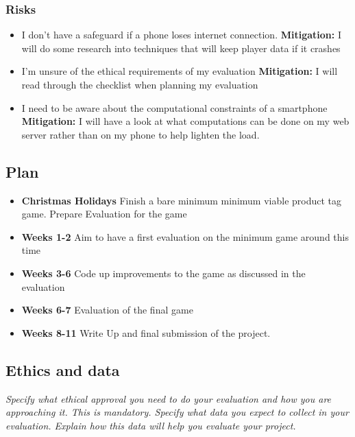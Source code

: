 \documentclass[11pt]{article}
\begin{document}
\subsubsection{Risks}\label{risks}


\begin{itemize}
    \tightlist
    \item I don't have a safeguard if a phone loses internet connection. \textbf{Mitigation:} I will do some research into techniques that will keep player data if it crashes
    \item I'm unsure of the ethical requirements of my evaluation \textbf{Mitigation:} I will read through the checklist when planning my evaluation
    \item I need to be aware about the computational constraints of a smartphone \textbf{Mitigation:} I will have a look at what computations can be done on my web server rather than on my phone to help lighten the load.
\end{itemize}

\subsection{Plan}\label{plan}

\begin{itemize}
    \tightlist
    \item \textbf{Christmas Holidays} Finish a bare minimum minimum viable product tag game. Prepare Evaluation for the game
    \item \textbf{Weeks 1-2} Aim to have a first evaluation on the minimum game around this time
    \item \textbf{Weeks 3-6} Code up improvements to the game as discussed in the evaluation
    \item \textbf{Weeks 6-7} Evaluation of the final game
    \item \textbf{Weeks 8-11} Write Up and final submission of the project.
\end{itemize}


    
\subsection{Ethics and data}\label{ethics}
\emph{Specify what ethical approval you need to do your evaluation and how you are approaching it. This is mandatory. 
Specify what data you expect to collect in your evaluation. Explain how this data will help you evaluate your project.
}
\end{document}
